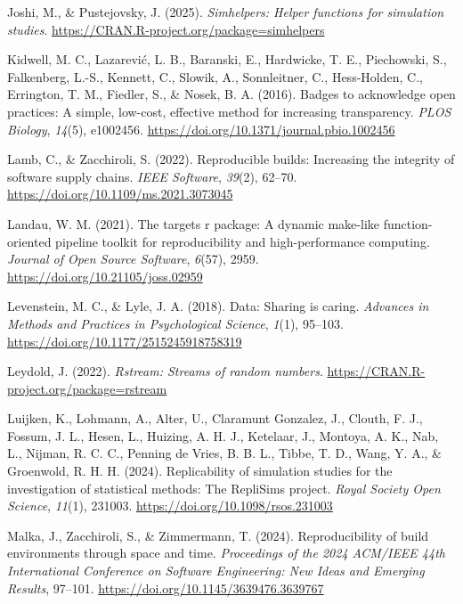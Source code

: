 \documentclass[
  man,
  longtable,
  nolmodern,
  notxfonts,
  notimes,
  colorlinks=true,linkcolor=blue,citecolor=blue,urlcolor=blue]{apa7}
\newlength{\cslhangindent}
\newenvironment{CSLReferences}[2] %
 {\begin{list}{}{%
  \setlength{\itemindent}{0pt}
  \setlength{\leftmargin}{0pt}
  \setlength{\parsep}{0pt}
  \ifodd #1
   \setlength{\leftmargin}{\cslhangindent}
   \setlength{\itemindent}{-1\cslhangindent}
  \fi
  \setlength{\itemsep}{#2\baselineskip}}}
 {\end{list}}
\begin{document}
\begin{CSLReferences}{1}{0}
Joshi, M., \& Pustejovsky, J. (2025). \emph{Simhelpers: Helper functions
for simulation studies}.
\url{https://CRAN.R-project.org/package=simhelpers}

Kidwell, M. C., Lazarević, L. B., Baranski, E., Hardwicke, T. E.,
Piechowski, S., Falkenberg, L.-S., Kennett, C., Slowik, A., Sonnleitner,
C., Hess-Holden, C., Errington, T. M., Fiedler, S., \& Nosek, B. A.
(2016). Badges to acknowledge open practices: A simple, low-cost,
effective method for increasing transparency. \emph{PLOS Biology},
\emph{14}(5), e1002456.
\url{https://doi.org/10.1371/journal.pbio.1002456}

Lamb, C., \& Zacchiroli, S. (2022). Reproducible builds: Increasing the
integrity of software supply chains. \emph{IEEE Software}, \emph{39}(2),
62--70. \url{https://doi.org/10.1109/ms.2021.3073045}

Landau, W. M. (2021). The targets r package: A dynamic make-like
function-oriented pipeline toolkit for reproducibility and
high-performance computing. \emph{Journal of Open Source Software},
\emph{6}(57), 2959. \url{https://doi.org/10.21105/joss.02959}

Levenstein, M. C., \& Lyle, J. A. (2018). Data: Sharing is caring.
\emph{Advances in Methods and Practices in Psychological Science},
\emph{1}(1), 95--103. \url{https://doi.org/10.1177/2515245918758319}

Leydold, J. (2022). \emph{Rstream: Streams of random numbers}.
\url{https://CRAN.R-project.org/package=rstream}

Luijken, K., Lohmann, A., Alter, U., Claramunt Gonzalez, J., Clouth, F.
J., Fossum, J. L., Hesen, L., Huizing, A. H. J., Ketelaar, J., Montoya,
A. K., Nab, L., Nijman, R. C. C., Penning de Vries, B. B. L., Tibbe, T.
D., Wang, Y. A., \& Groenwold, R. H. H. (2024). Replicability of
simulation studies for the investigation of statistical methods: The
{RepliSims} project. \emph{Royal Society Open Science}, \emph{11}(1),
231003. \url{https://doi.org/10.1098/rsos.231003}

Malka, J., Zacchiroli, S., \& Zimmermann, T. (2024). Reproducibility of
build environments through space and time. \emph{Proceedings of the 2024
ACM/IEEE 44th International Conference on Software Engineering: New
Ideas and Emerging Results}, 97--101.
\url{https://doi.org/10.1145/3639476.3639767}


\end{CSLReferences}
\end{document}
